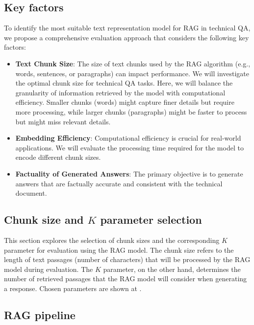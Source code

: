\subsection{Key factors}
To identify the most suitable text representation model for \ac{RAG} in technical \ac{QA}, we propose a comprehensive evaluation approach that considers the following key factors:

\begin{itemize}
  \item \textbf{Text Chunk Size}:
    The size of text chunks used by the \ac{RAG} algorithm (e.g., words, sentences, or paragraphs) can impact performance.
    We will investigate the optimal chunk size for technical \ac{QA} tasks.
    Here, we will balance the granularity of information retrieved by the model with computational efficiency.
    Smaller chunks (words) might capture finer details but require more processing, while larger chunks (paragraphs) might be faster to process but might miss relevant details.  
  \item \textbf{Embedding Efficiency}:
    Computational efficiency is crucial for real-world applications.
    We will evaluate the processing time required for the model to encode different chunk sizes.
  \item \textbf{Factuality of Generated Answers}:
    The primary objective is to generate answers that are factually accurate and consistent with the technical document.
\end{itemize}

\subsection{Chunk size and $K$ parameter selection}
This section explores the selection of chunk sizes and the corresponding $K$ parameter for evaluation using the \ac{RAG} model.
The chunk size refers to the length of text passages (number of characters) that will be processed by the \ac{RAG} model during evaluation.
The $K$ parameter, on the other hand, determines the number of retrieved passages that the \ac{RAG} model will consider when generating a response.
Chosen parameters are shown at .



\subsection{\ac{RAG} pipeline}

